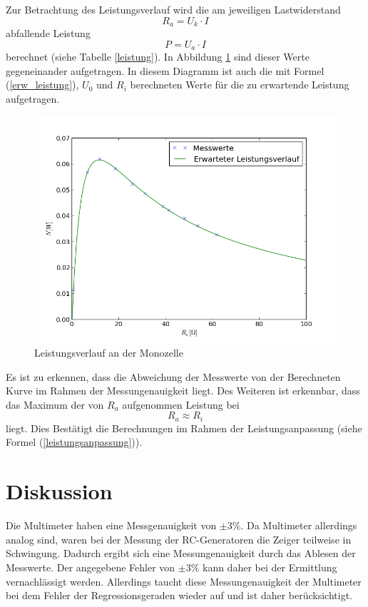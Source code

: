 \documentclass[11pt]{article}
\begin{document}
Zur Betrachtung des Leistungsverlauf wird die am jeweiligen Lastwiderstand 
\begin{equation}
R_a = U_k \cdot I
\end{equation}
 abfallende Leistung
\begin{equation}
P = U_a\cdot  I
\end{equation}
berechnet (siehe Tabelle \ref{leistung}). In Abbildung \ref{Plot4} sind dieser Werte gegeneinander aufgetragen. In diesem Diagramm ist auch die mit Formel (\ref{erw_leistung}), $U_0$ und $R_i$ berechneten Werte f\"ur die zu erwartende Leistung aufgetragen.
\begin{figure}
\centering
\includegraphics[scale=1.00]{Plot4.png}
\caption{Leistungsverlauf an der Monozelle}
\label{Plot4}
\end{figure}
Es ist zu erkennen, dass die Abweichung der Messwerte von der Berechneten Kurve im Rahmen der Messungenauigkeit liegt. Des Weiteren ist erkennbar, dass das Maximum der von $R_a$ aufgenommen Leistung bei 
\[
R_a \approx R_i
\]
liegt. Dies Best\"atigt die Berechnungen im Rahmen der Leistungsanpassung (siehe Formel (\ref{leistungsanpassung})).
\section{Diskussion}
Die Multimeter haben eine Messgenauigkeit von $\pm 3 \%$. Da Multimeter allerdings analog sind, waren bei der Messung der RC-Generatoren die Zeiger teilweise in Schwingung. Dadurch ergibt sich eine Messungenauigkeit durch das Ablesen der Messwerte. Der angegebene Fehler von $\pm 3 \%$ kann daher bei der Ermittlung vernachlässigt werden. Allerdings taucht diese Messungenauigkeit der Multimeter bei dem Fehler der Regressionsgeraden wieder auf und ist daher berücksichtigt.
 
\end{document}
